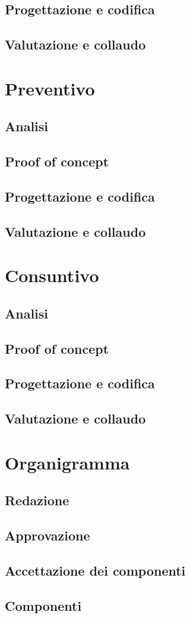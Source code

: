 \documentclass[a4paper, 11pt]{article}
\begin{document}
\subsection{Progettazione e codifica}
\subsection{Valutazione e collaudo}

\section{Preventivo}
\subsection{Analisi}
\subsection{Proof of concept}
\subsection{Progettazione e codifica}
\subsection{Valutazione e collaudo}

\section{Consuntivo}
\subsection{Analisi}
\subsection{Proof of concept}
\subsection{Progettazione e codifica}
\subsection{Valutazione e collaudo}

\section{Organigramma}
\subsection{Redazione}
\subsection{Approvazione}
\subsection{Accettazione dei componenti}
\subsection{Componenti}
\end{document}
